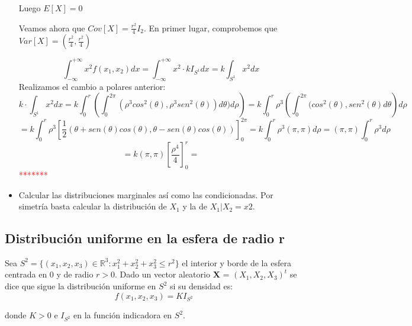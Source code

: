 \documentclass{article}
\theoremstyle{theorem-style}  %
\theoremstyle{definition}
\theoremstyle{example-style}
\begin{document}
\begin{itemize}
		Luego $E[X]=0$
		
		Veamos ahora que $Cov[X] = \frac{r^2}{4}I_2$. En primer lugar, comprobemos que $Var[X]=\left(\frac{r^2}{4},\frac{r^2}{4}\right)$
		
		$$\int_{-\infty}^{+\infty}x^2f(x_1,x_2)dx = \int_{-\infty}^{+\infty}x^2\cdot kI_{S^1}dx = k\int_{S^1}x^2dx$$
		Realizamos el cambio a polares anterior:
		$$k\cdot \int_{S^1}x^2dx = k \int_{0}^{r}\left(\int_{0}^{2\pi}(\rho^3cos^2(\theta),\rho^3sen^2(\theta))d\theta)d\rho\right) = k \int_{0}^{r}\rho^3\left(\int_0^{2\pi}(cos^2(\theta),sen^2(\theta)d\theta\right)d\rho$$
		$$=k \int_{0}^{r}\rho^3\left[\frac{1}{2}\left(\theta+sen(\theta)cos(\theta),\theta-sen(\theta)cos(\theta)\right)\right]^{2\pi}_{0} =k\int_{0}^{r}\rho^3(\pi,\pi)d\rho = (\pi,\pi)\int_{0}^{r}\rho^3 d\rho$$
		$$=k(\pi,\pi)\left[\frac{\rho^4}{4}\right]^r_0 = $$
		\textcolor{red}{*******}
		
		
		\item Calcular las distribuciones marginales así como las condicionadas. Por simetría basta calcular la distribución de $X_1$  y la de $X_1|X_2=x2$. 
		
		 
	\end{itemize} 
	
	
	\subsection{Distribución uniforme en la esfera de radio r}
	
	Sea $S^2=\{(x_1, x_2, x_3) \in  \mathbb{R}^3: x_1^2 + x_2^2+x_3^2\leq r^2\}$ el interior y borde de la esfera centrada en 0 y de radio $r>0$. Dado un vector aleatorio \textbf{X} = $(X_1, X_2, X_3)^t$ se dice que sigue la distribución uniforme en $S^2$ si su densidad es:
	$$ f(x_1, x_2, x_3)= KI_{S^2}$$
	
	donde $K>0$ e $I_{S^2}$ en la función indicadora en $S^2$. 
	
\end{document}
